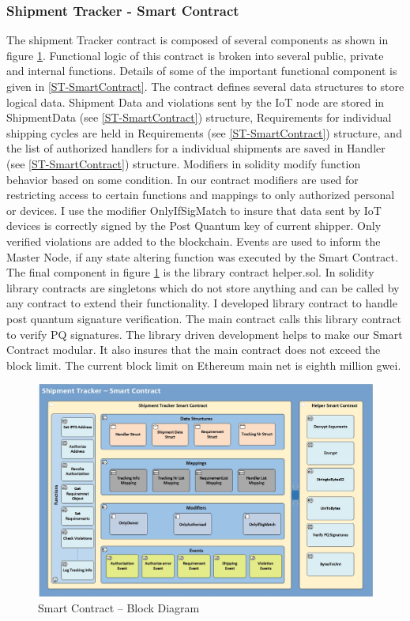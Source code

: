 \subsubsection{Shipment Tracker - Smart Contract} \label{ST-SC} 
The shipment Tracker contract is composed of several components as shown in figure \ref{fig:ArchitectureSC}. Functional logic of this contract is broken into several public, private and internal functions. Details of some of the important functional component is given in \ref{ST-SmartContract}.  The contract defines several data structures to store logical data. Shipment Data and violations sent by the IoT node are stored in ShipmentData (see \ref{ST-SmartContract}) structure, Requirements for individual shipping cycles are held in Requirements (see \ref{ST-SmartContract}) structure, and the list of authorized handlers for a individual shipments are saved in Handler (see \ref{ST-SmartContract}) structure. Modifiers in solidity modify function behavior based on some condition. In our contract modifiers are used for restricting access to certain functions and mappings to only authorized personal or devices. I use the modifier OnlyIfSigMatch to insure that data sent by IoT devices is correctly signed by the Post Quantum key of current shipper. Only verified violations are added to the blockchain. Events are used to inform the Master Node, if any state altering function was executed by the Smart Contract. The final component in figure \ref{fig:ArchitectureSC} is the library contract helper.sol. In solidity library contracts are singletons which do not store anything and can be called by any contract to extend their functionality. I developed library contract to handle post quantum signature verification. The main contract calls this library contract to verify PQ signatures. The library driven development helps to make our Smart Contract modular. It also insures that the main contract does not exceed the block limit. The current block limit on Ethereum main net is eighth million gwei.  
\begin{figure}[h]
	\centering
    \includegraphics[width=170mm,scale=1]{figs/SC-BD}
	\caption{Smart Contract – Block Diagram}
	\label{fig:ArchitectureSC} 
\end{figure}
\clearpage




